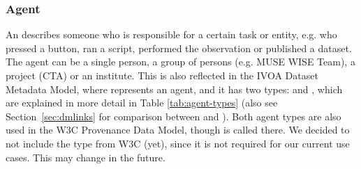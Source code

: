 %




\subsubsection{Agent}\label{sec:w3c-agent}

An  describes someone who is responsible for a certain task or
entity, e.g. who pressed a button, 
ran a script, performed the observation or published a dataset.
The agent can be a single person, a group of persons (e.g. MUSE WISE Team), a 
project (CTA) or an institute. 
This is also reflected in the IVOA Dataset Metadata Model, where  
represents an agent, and it has two types:  and ,
which are explained in more detail in Table \ref{tab:agent-types} (also see Section~\ref{sec:dmlinks} for comparison between  and ).
Both agent types are also used in the W3C Provenance Data Model, though 
 is called  there.
We decided to not include the type  from W3C (yet), since it is not required for our current use cases. This may change in the future.

